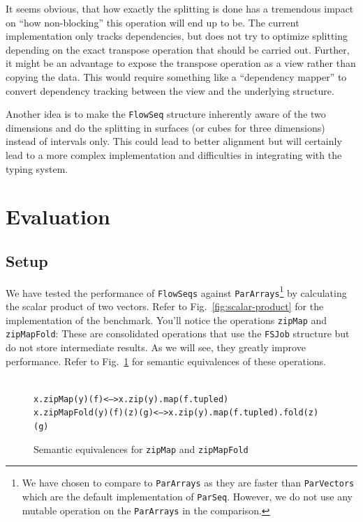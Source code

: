 \documentclass[runningheads,a4paper,fleqn]{llncs}
\begin{document}
It seems obvious, that how exactly the splitting is done has a
tremendous 
impact on ``how non-blocking'' this operation will end up to be. The
current implementation only tracks dependencies, but does not try to
optimize splitting depending on the exact transpose operation that
should be carried out. Further, it might be an advantage to expose the
transpose operation as a view rather than copying the data. This would
require something like a ``dependency mapper'' to convert dependency
tracking between the view and the underlying structure.

Another idea is to make the \texttt{FlowSeq} structure inherently aware of
the two dimensions and do the splitting in surfaces (or cubes for
three dimensions) instead of intervals only. This could lead to better
alignment but will certainly lead to a more complex implementation and
difficulties in integrating with the typing system.

\section{Evaluation}
\label{sec:evaluation}

\subsection{Setup}

We have tested the performance of \texttt{FlowSeqs} against
\texttt{ParArrays}\footnote{We have chosen to compare to
  \texttt{ParArrays} as they are faster than \texttt{ParVectors} which
  are the default implementation of \texttt{ParSeq}. However, we do
  not use any mutable operation on the \texttt{ParArrays} in the
  comparison.} by calculating the scalar product of two vectors. Refer
to
Fig.~\ref{fig:scalar-product} for the implementation of the
benchmark. You'll notice the operations \texttt{zipMap} and
\texttt{zipMapFold}: These are consolidated operations that use the
\texttt{FSJob} structure but do not store intermediate results. As we
will see, they greatly improve performance. Refer to
Fig.~\ref{fig:zipmapfold-semeq} for semantic equivalences of these
operations. 

\begin{figure}
\begin{alltt}{\scriptsize
x.zipMap(y)(f)             <-->  x.zip(y).map(f.tupled)
x.zipMapFold(y)(f)(z)(g)   <-->  x.zip(y).map(f.tupled).fold(z)(g)}
\end{alltt}
\caption{Semantic equivalences for \texttt{zipMap} and
  \texttt{zipMapFold}}
\label{fig:zipmapfold-semeq}
\end{figure}
\end{document}
